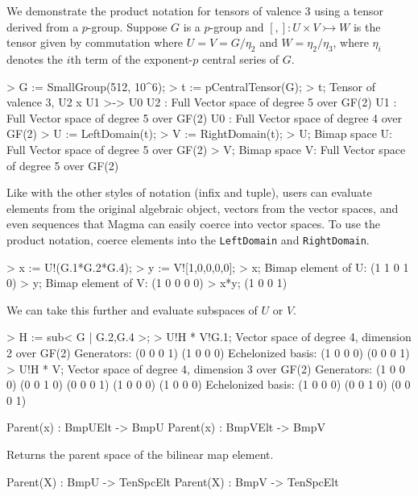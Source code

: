 \begin{example}[BimapProduct]

We demonstrate the product notation for tensors of valence 3 using a tensor
derived from a $p$-group. Suppose $G$ is a $p$-group and $[,] : U\times
V\rightarrowtail W$ is the tensor given by commutation where $U=V=G/\eta_2$ and
$W=\eta_2/\eta_3$, where $\eta_i$ denotes the $i$th term of the exponent-$p$
central series of $G$.
\begin{code}
> G := SmallGroup(512, 10^6);
> t := pCentralTensor(G);
> t;
Tensor of valence 3, U2 x U1 >-> U0
U2 : Full Vector space of degree 5 over GF(2)
U1 : Full Vector space of degree 5 over GF(2)
U0 : Full Vector space of degree 4 over GF(2)
> U := LeftDomain(t);
> V := RightDomain(t);
> U;
Bimap space U: Full Vector space of degree 5 over GF(2)
> V;
Bimap space V: Full Vector space of degree 5 over GF(2)
\end{code}

Like with the other styles of notation (infix and tuple), users can evaluate
elements from the original algebraic object, vectors from the vector spaces, and
even sequences that \textsf{Magma} can easily coerce into vector spaces. To use the
product notation, coerce elements into the \texttt{LeftDomain} and
\texttt{RightDomain}.

\begin{code}
> x := U!(G.1*G.2*G.4);
> y := V![1,0,0,0,0];
> x;
Bimap element of U: (1 1 0 1 0)
> y;
Bimap element of V: (1 0 0 0 0)
> x*y;
(1 0 0 1)
\end{code}

We can take this further and evaluate subspaces of $U$ or $V$.
\begin{code}
> H := sub< G | G.2,G.4 >;
> U!H * V!G.1;
Vector space of degree 4, dimension 2 over GF(2)
Generators:
(0 0 0 1)
(1 0 0 0)
Echelonized basis:
(1 0 0 0)
(0 0 0 1)
> U!H * V;
Vector space of degree 4, dimension 3 over GF(2)
Generators:
(1 0 0 0)
(0 0 1 0)
(0 0 0 1)
(1 0 0 0)
(1 0 0 0)
Echelonized basis:
(1 0 0 0)
(0 0 1 0)
(0 0 0 1)
\end{code}
\end{example}


\begin{intrinsics}
Parent(x) : BmpUElt -> BmpU
Parent(x) : BmpVElt -> BmpV
\end{intrinsics}

Returns the parent space of the bilinear map element.

\begin{intrinsics}
Parent(X) : BmpU -> TenSpcElt
Parent(X) : BmpV -> TenSpcElt
\end{intrinsics}

